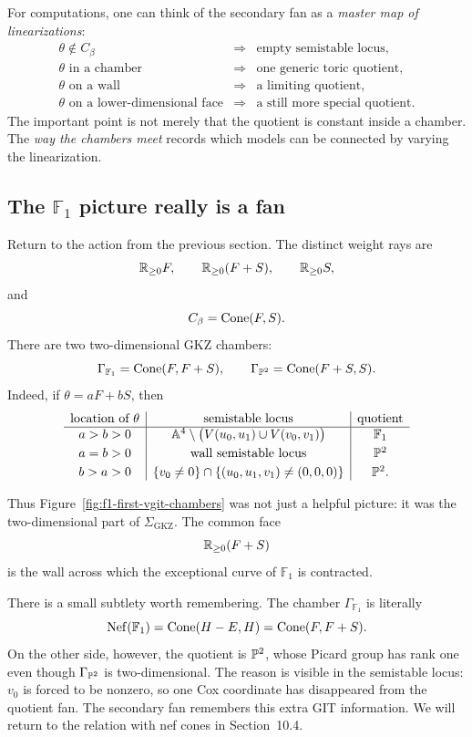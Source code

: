 \begin{agcheatsheet}
For computations, one can think of the secondary fan as a
\emph{master map of linearizations}:
\[
\boxed{
\begin{array}{ccl}
\theta\notin C_\beta
&\Longrightarrow&
\text{empty semistable locus},
\\[1mm]
\theta\text{ in a chamber}
&\Longrightarrow&
\text{one generic toric quotient},
\\[1mm]
\theta\text{ on a wall}
&\Longrightarrow&
\text{a limiting quotient},
\\[1mm]
\theta\text{ on a lower-dimensional face}
&\Longrightarrow&
\text{a still more special quotient}.
\end{array}}
\]
The important point is not merely that the quotient is constant inside
a chamber.  The \emph{way the chambers meet} records which models can
be connected by varying the linearization.
\end{agcheatsheet}

\subsection{The \texorpdfstring{\(\mathbb F_1\)}{F1} picture really is a fan}

Return to the action from the previous section.  The distinct weight
rays are
\[
\mathbb{R}_{\geq0}F,
\qquad
\mathbb{R}_{\geq0}(F+S),
\qquad
\mathbb{R}_{\geq0}S,
\]
and
\[
C_\beta=\operatorname{Cone}(F,S).
\]
There are two two-dimensional GKZ chambers:
\[
\Gamma_{\mathbb F_1}
=
\operatorname{Cone}(F,F+S),
\qquad
\Gamma_{\mathbb{P}^2}
=
\operatorname{Cone}(F+S,S).
\]
Indeed, if \(\theta=aF+bS\), then
\[
\begin{array}{c|c|c}
\text{location of }\theta
&\text{semistable locus}
&\text{quotient}
\\
\hline
a>b>0
&\mathbb{A}^4\setminus
\bigl(V(u_0,u_1)\cup V(v_0,v_1)\bigr)
&\mathbb F_1
\\[1mm]
a=b>0
&\text{wall semistable locus}
&\mathbb{P}^2
\\[1mm]
b>a>0
&\{v_0\neq0\}\cap
\{(u_0,u_1,v_1)\neq(0,0,0)\}
&\mathbb{P}^2.
\end{array}
\]

Thus Figure~\ref{fig:f1-first-vgit-chambers} was not just a helpful
picture: it was the two-dimensional part of
\(\Sigma_{\mathrm{GKZ}}\).  The common face
\[
\mathbb{R}_{\geq0}(F+S)
\]
is the wall across which the exceptional curve of \(\mathbb F_1\) is
contracted.

There is a small subtlety worth remembering.  The chamber
\(\Gamma_{\mathbb F_1}\) is literally
\[
\operatorname{Nef}(\mathbb F_1)
=
\operatorname{Cone}(H-E,H)
=
\operatorname{Cone}(F,F+S).
\]
On the other side, however, the quotient is \(\mathbb{P}^2\), whose Picard
group has rank one even though \(\Gamma_{\mathbb{P}^2}\) is two-dimensional.
The reason is visible in the semistable locus: \(v_0\) is forced to be
nonzero, so one Cox coordinate has disappeared from the quotient fan.
The secondary fan remembers this extra GIT information.  We will return
to the relation with nef cones in Section~10.4.

